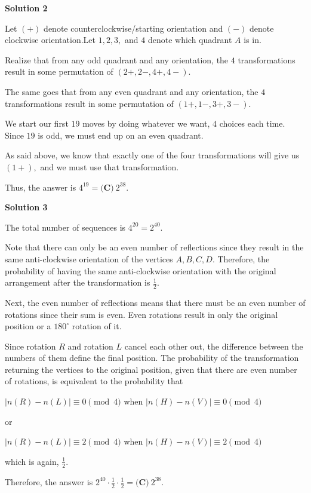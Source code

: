 \begin{enumerate}
\textbf{Solution 2}

Let $(+)$ denote counterclockwise/starting orientation and $(-)$ denote clockwise orientation.Let $1,2,3,$ and $4$ denote which quadrant $A$ is in.

 Realize that from any odd quadrant and any orientation, the $4$ transformations result in some permutation of $(2+, 2-, 4+, 4-).$

 The same goes that from any even quadrant and any orientation, the $4$ transformations result in some permutation of $(1+, 1-, 3+, 3-).$

 We start our first $19$ moves by doing whatever we want, $4$ choices each time. Since $19$ is odd, we must end up on an even quadrant. 

 As said above, we know that exactly one of the four transformations will give us $(1+),$ and we must use that transformation.

 Thus, the answer is $4^{19}=\boxed{\textbf{(C)}\ 2^{38}}.$




\textbf{Solution 3}

The total number of sequences is $4^{20}=2^{40}.$

 Note that there can only be an even number of reflections since they result in the same anti-clockwise orientation of the vertices $A,B,C,D.$ Therefore, the probability of having the same anti-clockwise orientation with the original arrangement after the transformation is $\frac{1}{2}.$

 Next, the even number of reflections means that there must be an even number of rotations since their sum is even. Even rotations result in only the original position or a $180^{\circ}$ rotation of it. 

 Since rotation $R$ and rotation $L$ cancel each other out, the difference between the numbers of them define the final position. The probability of the transformation returning the vertices to the original position, given that there are even number of rotations, is equivalent to the probability that

 $|n(R)-n(L)|\equiv0\pmod{4}$ when $|n(H)-n(V)|\equiv0\pmod{4}$

 or

 $|n(R)-n(L)|\equiv2\pmod{4}$ when $|n(H)-n(V)|\equiv2\pmod{4}$

 which is again, $\frac{1}{2}.$

 Therefore, the answer is $2^{40}\cdot\frac{1}{2}\cdot\frac{1}{2}=\boxed{\textbf{(C)}\ 2^{38}}.$





\end{enumerate}
